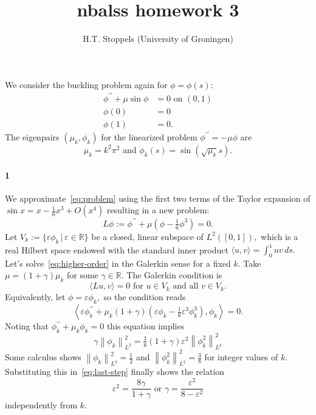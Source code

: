 \documentclass[a4paper]{article}
\author{H.T. Stoppels (University of Groningen)}
\title{{\sc nbalss} homework 3}
\newcommand{\norm}[1]{\left\lVert#1\right\rVert}
\begin{document}
  \maketitle
  
  \noindent We consider the buckling problem again for $\phi = \phi(s):$
  \begin{equation}\label{eq:problem}
  \begin{aligned}
    \phi^{\prime\prime} + \mu \sin \phi &= 0 \text{ on } (0, 1) \\
    \phi(0) &= 0 \\
    \phi(1) &= 0.
  \end{aligned}
  \end{equation}
  The eigenpairs $(\mu_k, \phi_k)$ for the linearized problem $\phi^{\prime\prime} = -\mu \phi$ are $$\mu_k = k^2\pi^2 \text { and } \phi_k(s) = \sin(\sqrt{\mu_k}s).$$

  \paragraph{1} We approximate~\eqref{eq:problem} using the first two terms of the Taylor expansion of $\sin x = x - \tfrac{1}{6}x^3 + O(x^4)$ resulting in a new problem:
  \begin{equation}\label{eq:higher-order}
    L\phi := \phi^{\prime\prime} + \mu (\phi - \tfrac{1}{6}\phi^3) = 0.
  \end{equation}
  Let $V_k := \{\varepsilon\phi_k \,|\, \varepsilon \in \mathbb{R}\}$ be a closed, linear subspace of $L^2([0, 1]),$ which is a real Hilbert space endowed with the standard inner product $\langle u, v\rangle = \int_0^1uv \, ds.$ Let's solve~\eqref{eq:higher-order} in the Galerkin sense for a fixed $k$. Take $\mu = (1 + \gamma)\mu_k$ for some $\gamma \in \mathbb{R}.$ The Galerkin condition is
  \begin{equation}
    \langle Lu, v \rangle = 0 \text{ for } u \in V_k \text{ and all } v \in V_k.
  \end{equation}
  Equivalently, let $\phi = \varepsilon \phi_k,$ so the condition reads
  \begin{equation}
    \left\langle \varepsilon\phi_k^{\prime\prime} + \mu_k(1 + \gamma)(\varepsilon \phi_k - \tfrac{1}{6}\varepsilon^3\phi_k^3), \phi_k \right\rangle = 0.
  \end{equation}
  Noting that $\phi_k^{\prime\prime} + \mu_k \phi_k = 0$ this equation implies
  \begin{equation}\label{eq:last-step}
    \gamma \norm{\phi_k}^2_{L^2} = \tfrac{1}{6}(1 + \gamma)\varepsilon^2 \norm{\phi_k^2}^2_{L^2}
  \end{equation}
  Some calculus shows $\norm{\phi_k}^2_{L^2} = \tfrac{1}{2}$ and $\norm{\phi_k^2}^2_{L^2} = \tfrac{3}{8}$ for integer values of $k$. Substituting this in~\eqref{eq:last-step} finally shows the relation
  \begin{equation}
    \varepsilon^2 = \frac{8 \gamma}{1 + \gamma} \text{ or } \gamma = \frac{\varepsilon^2}{8 - \varepsilon^2 }
  \end{equation}
  independently from $k.$
\end{document}
